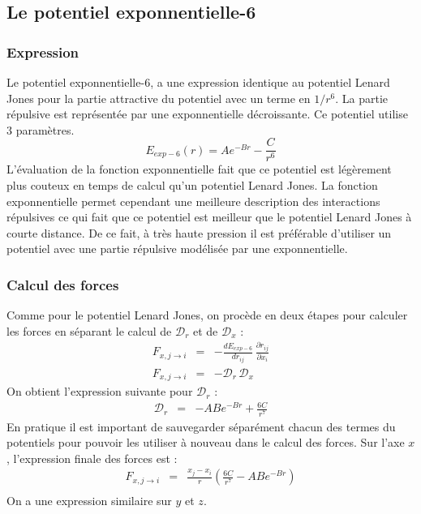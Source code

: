 \documentclass[11pt,a4paper,fleqn]{book}
\begin{document}
\subsection{Le potentiel exponnentielle-6}

\subsubsection{Expression}

Le potentiel exponnentielle-6, a une expression identique au potentiel Lenard
Jones pour la partie attractive du potentiel avec un terme en $1/r^6$. La partie
répulsive est représentée par une exponnentielle décroissante. Ce potentiel 
utilise 3 paramètres.
%
\begin{equation} \label{eq_pot_exp-6}
	E_{exp-6}(r) = A e^{-Br} - \frac{C}{r^6}
\end{equation}
%
L'évaluation de la fonction exponnentielle fait que ce potentiel est légèrement
plus couteux en temps de calcul qu'un potentiel Lenard Jones. La fonction
exponnentielle permet cependant une meilleure description des interactions
répulsives ce qui fait que ce potentiel est meilleur que le potentiel
Lenard Jones à courte distance. De ce fait, à très haute pression il
est préférable d'utiliser un potentiel avec une partie répulsive
modélisée par une exponnentielle.

\subsubsection{Calcul des forces}

Comme pour le potentiel Lenard Jones, on procède en deux étapes pour 
calculer les forces en séparant le calcul de $\mathcal{D}_r$ et de
$\mathcal{D}_x$ :
%
\begin{eqnarray*}
	F_{x,j\rightarrow i} & = & -\frac{d E_{exp-6}}{d r_{ij}}\,\frac{\partial r_{ij}}{\partial x_i} \\
	F_{x,j\rightarrow i} & = & -\mathcal{D}_r \, \mathcal{D}_x \nonumber
\end{eqnarray*}
%
On obtient l'expression suivante pour $\mathcal{D}_r$ :
%
\begin{eqnarray}
	\mathcal{D}_r & = & -AB e^{-Br} + \frac{6C}{r^7}
\end{eqnarray}
%
En pratique il est important de sauvegarder séparément chacun des termes
du potentiels pour pouvoir les utiliser à nouveau dans le calcul
des forces. Sur l'axe $x$, l'expression finale des forces est : 
%
\begin{eqnarray*}
	F_{x,j\rightarrow i} & = & \frac{x_j-x_i}{r}\left(\frac{6C}{r^7}-AB e^{-Br} \right)\\
\end{eqnarray*}
%
On a une expression similaire sur $y$ et $z$.
\end{document}
